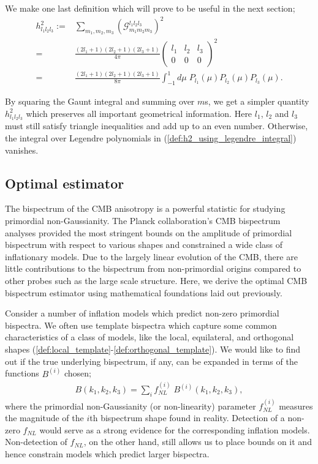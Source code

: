 We make one last definition which will prove to be useful in the next section;
\begin{align}
	h^2_{l_1 l_2 l_3} :=& \sum_{m_1, m_2, m_3} \left( \mathcal{G}^{l_1 l_2 l_3}_{m_1 m_2 m_3} \right)^2  \label{def:h2_using_gaunt_integral}\\
	=& \frac{(2l_1+1)(2l_2+1)(2l_3+1)}{4\pi} { \begin{pmatrix}	l_1 & l_2 & l_3 \\ 0 & 0 & 0 \end{pmatrix} }^2 \\
	=& \frac{(2l_1+1)(2l_2+1)(2l_3+1)}{8\pi} \int_{-1}^{1} d\mu \; P_{l_1}(\mu) P_{l_2}(\mu) P_{l_3}(\mu). \label{def:h2_using_legendre_integral}
\end{align}

By squaring the Gaunt integral and summing over $m$s, we get a simpler quantity $h^2_{l_1 l_2 l_3}$ which preserves all important geometrical information. Here $l_1$, $l_2$ and $l_3$ must still satisfy triangle inequalities and add up to an even number. Otherwise, the integral over Legendre polynomials in (\ref{def:h2_using_legendre_integral}) vanishes.

\subsection{Optimal estimator}
The bispectrum of the CMB anisotropy is a powerful statistic for studying primordial non-Gaussianity. The Planck collaboration's CMB bispectrum analyses provided the most stringent bounds on the amplitude of primordial bispectrum with respect to various shapes and constrained a wide class of inflationary models. Due to the largely linear evolution of the CMB, there are little contributions to the bispectrum from non-primordial origins compared to other probes such as the large scale structure. Here, we derive the optimal CMB bispectrum estimator using mathematical foundations laid out previously.

Consider a number of inflation models which predict non-zero primordial bispectra. We often use template bispectra which capture some common characteristics of a class of models, like the local, equilateral, and orthogonal shapes (\ref{def:local_template}-\ref{def:orthogonal_template}). We would like to find out if the true underlying bispectrum, if any, can be expanded in terms of the functions $B^{(i)}$ chosen;
\begin{align}
	B(k_1,k_2,k_3) = \sum_i f_{NL}^{(i)} \; B^{(i)}(k_1,k_2,k_3), \label{eqn:primordial_bispectrum_fNLs}
\end{align}
where the primordial non-Gaussianity (or non-linearity) parameter $f^{(i)}_{NL}$ measures the magnitude of the $i$th bispectrum shape found in reality. Detection of a non-zero $f_{NL}$ would serve as a strong evidence for the corresponding inflation models. Non-detection of $f_{NL}$, on the other hand, still allows us to place bounds on it and hence constrain models which predict larger bispectra.

